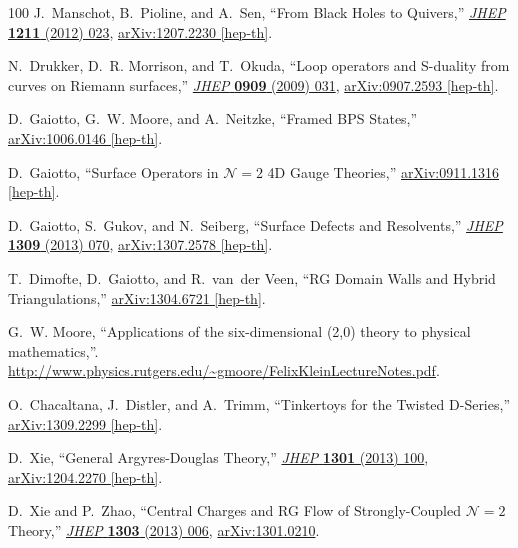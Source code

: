 \begin{thebibliography}{100}
J.~Manschot, B.~Pioline, and A.~Sen, ``{From Black Holes to Quivers},''
\href{http://dx.doi.org/10.1007/JHEP11(2012)023}{{\em JHEP} {\bfseries 1211} (2012) 023},
\href{http://arxiv.org/abs/1207.2230}{{\ttfamily arXiv:1207.2230 [hep-th]}}.

N.~Drukker, D.~R. Morrison, and T.~Okuda, ``{Loop operators and S-duality from curves on Riemann surfaces},''
\href{http://dx.doi.org/10.1088/1126-6708/2009/09/031}{{\em JHEP} {\bfseries 0909} (2009) 031},
\href{http://arxiv.org/abs/0907.2593}{{\ttfamily arXiv:0907.2593 [hep-th]}}.

D.~Gaiotto, G.~W. Moore, and A.~Neitzke, ``{Framed BPS States},''
\href{http://arxiv.org/abs/1006.0146}{{\ttfamily arXiv:1006.0146 [hep-th]}}.

D.~Gaiotto, ``{Surface Operators in ${\mathcal{N}}\!=2$ 4D Gauge Theories},''
\href{http://arxiv.org/abs/0911.1316}{{\ttfamily arXiv:0911.1316 [hep-th]}}.

D.~Gaiotto, S.~Gukov, and N.~Seiberg, ``{Surface Defects and Resolvents},''
\href{http://dx.doi.org/10.1007/JHEP09(2013)070}{{\em JHEP} {\bfseries 1309} (2013) 070},
\href{http://arxiv.org/abs/1307.2578}{{\ttfamily arXiv:1307.2578 [hep-th]}}.

T.~Dimofte, D.~Gaiotto, and R.~van~der Veen, ``{RG Domain Walls and Hybrid Triangulations},''
\href{http://arxiv.org/abs/1304.6721}{{\ttfamily arXiv:1304.6721 [hep-th]}}.

G.~W. Moore, ``{Applications of the six-dimensional (2,0) theory to physical mathematics},''.
\url{http://www.physics.rutgers.edu/~gmoore/FelixKleinLectureNotes.pdf}.

O.~Chacaltana, J.~Distler, and A.~Trimm, ``{Tinkertoys for the Twisted D-Series},''
\href{http://arxiv.org/abs/1309.2299}{{\ttfamily arXiv:1309.2299 [hep-th]}}.

D.~Xie, ``{General Argyres-Douglas Theory},''
\href{http://dx.doi.org/10.1007/JHEP01(2013)100}{{\em JHEP} {\bfseries 1301} (2013) 100},
\href{http://arxiv.org/abs/1204.2270}{{\ttfamily arXiv:1204.2270 [hep-th]}}.

D.~Xie and P.~Zhao, ``{Central Charges and RG Flow of Strongly-Coupled ${\mathcal{N}}\!=2$ Theory},''
\href{http://dx.doi.org/10.1007/JHEP03(2013)006}{{\em JHEP} {\bfseries 1303} (2013) 006},
\href{http://arxiv.org/abs/1301.0210}{{\ttfamily arXiv:1301.0210}}.


\end{thebibliography}
